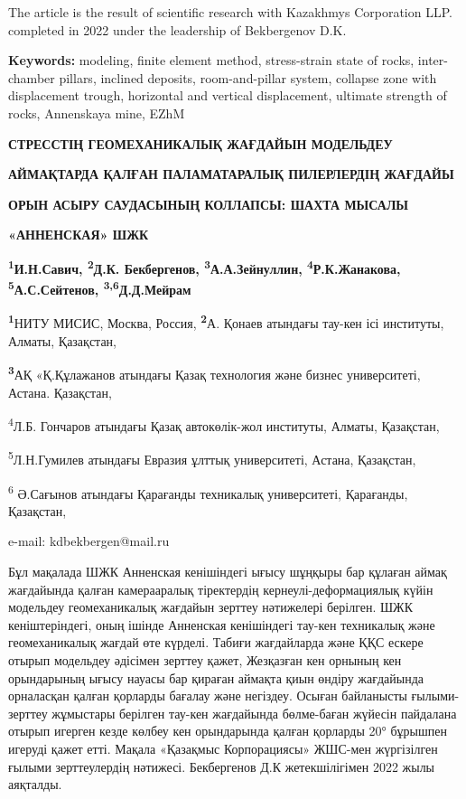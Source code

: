 The article is the result of scientific research with Kazakhmys
Corporation LLP. completed in 2022 under the leadership of Bekbergenov
D.K.

{\bfseries Keywords:} modeling, finite element method, stress-strain state
of rocks, inter-chamber pillars, inclined deposits, room-and-pillar
system, collapse zone with displacement trough, horizontal and vertical
displacement, ultimate strength of rocks, Annenskaya mine, EZhM

{\bfseries СТРЕССТІҢ ГЕОМЕХАНИКАЛЫҚ ЖАҒДАЙЫН МОДЕЛЬДЕУ}

{\bfseries АЙМАҚТАРДА ҚАЛҒАН ПАЛАМАТАРАЛЫҚ ПИЛЕРЛЕРДІҢ ЖАҒДАЙЫ}

{\bfseries ОРЫН АСЫРУ САУДАСЫНЫҢ КОЛЛАПСЫ: ШАХТА МЫСАЛЫ}

{\bfseries «АННЕНСКАЯ» ШЖК}

{\bfseries \textsuperscript{1}И.Н.Савич, \textsuperscript{2}Д.К.
Бекбергенов\textsuperscript{\envelope }, \textsuperscript{3}А.А.Зейнуллин,
\textsuperscript{4}Р.К.Жанакова, \textsuperscript{5}А.С.Сейтенов,
\textsuperscript{3,6}Д.Д.Мейрам}

{\bfseries \textsuperscript{1}}НИТУ МИСИС, Москва, Россия,
{\bfseries \textsuperscript{2}}А. Қонаев атындағы тау-кен ісі институты,
Алматы, Қазақстан,

{\bfseries \textsuperscript{3}}АҚ «Қ.Құлажанов атындағы Қазақ технология
және бизнес университеті, Астана. Қазақстан,

\textsuperscript{4}Л.Б. Гончаров атындағы Қазақ автокөлік-жол институты,
Алматы, Қазақстан,

\textsuperscript{5}Л.Н.Гумилев атындағы Евразия ұлттық университеті,
Астана, Қазақстан,

\textsuperscript{6} Ә.Сағынов атындағы Қарағанды техникалық
университеті, Қарағанды, Қазақстан,

e-mail: kdbekbergen@mail.ru

Бұл мақалада ШЖК Анненская кенішіндегі ығысу шұңқыры бар құлаған аймақ
жағдайында қалған камерааралық тіректердің кернеулі-деформациялық күйін
модельдеу геомеханикалық жағдайын зерттеу нәтижелері берілген. ШЖК
кеніштеріндегі, оның ішінде Анненская кенішіндегі тау-кен техникалық
және геомеханикалық жағдай өте күрделі. Табиғи жағдайларда және ҚҚС
ескере отырып модельдеу әдісімен зерттеу қажет, Жезқазған кен орнының
кен орындарының ығысу науасы бар қираған аймақта қиын өндіру жағдайында
орналасқан қалған қорларды бағалау және негіздеу. Осыған байланысты
ғылыми-зерттеу жұмыстары берілген тау-кен жағдайында бөлме-баған жүйесін
пайдалана отырып игерген кезде көлбеу кен орындарында қалған қорларды
20° бұрышпен игеруді қажет етті. Мақала «Қазақмыс Корпорациясы» ЖШС-мен
жүргізілген ғылыми зерттеулердің нәтижесі. Бекбергенов Д.К
жетекшілігімен 2022 жылы аяқталды.

